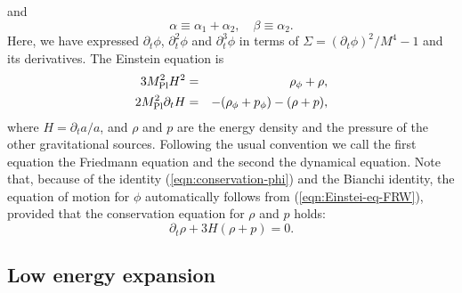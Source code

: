 and
%
\begin{equation}
 \alpha \equiv \alpha_1+\alpha_2, \quad \beta\equiv\alpha_2.
\end{equation}
Here, we have expressed $\partial_t\phi$, $\partial_t^2\phi$ and
$\partial_t^3\phi$ in terms of $\Sigma=(\partial_t\phi)^2/M^4-1$ and its 
derivatives. The Einstein equation is
%
\begin{eqnarray}
 3M_{\rm Pl}^2H^2 & = & \rho_{\phi} + \rho, \nonumber\\
 2M_{\rm Pl}^2\partial_tH & = & -(\rho_{\phi}+p_{\phi}) - (\rho+p),
  \label{eqn:Einstei-eq-FRW}
\end{eqnarray}
where $H=\partial_ta/a$, and $\rho$ and $p$ are the energy density and
the pressure of the other gravitational sources. Following the usual
convention we call the first equation the Friedmann equation and the
second the dynamical equation. Note that, because of the identity 
(\ref{eqn:conservation-phi}) and the Bianchi identity, the equation of 
motion for $\phi$ automatically follows from (\ref{eqn:Einstei-eq-FRW}),
provided that the conservation equation for $\rho$ and $p$ holds: 
%
\begin{equation}
 \partial_t\rho + 3H(\rho+p) = 0.
\end{equation}




\subsection{Low energy expansion}
\label{subsec:lowE-expansion-background}


